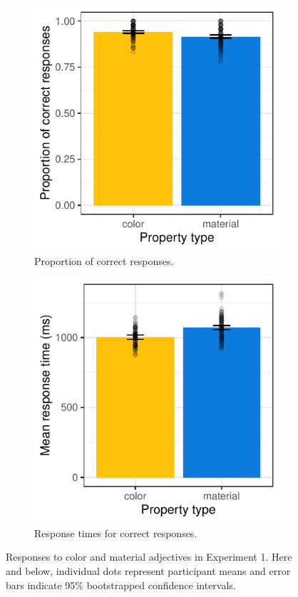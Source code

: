 \documentclass[12pt,letterpaper]{article}
\begin{document}
\begin{figure}[ht]
\centering
\begin{subfigure}{.4\textwidth}
\centering
\includegraphics[width=\textwidth]{plots/exp1_proportion.pdf}
\caption{Proportion of correct responses.}
\label{fig:exp1_a}
\end{subfigure} \hspace{9mm}
\begin{subfigure}{.4 \textwidth}
\centering
\includegraphics[width=\textwidth]{plots/exp1_rt.pdf}
\caption{Response times for correct responses.}
\label{fig:exp1_b}
\end{subfigure}
\caption{Responses to color and material adjectives in Experiment 1. Here and below, individual dots represent participant means and error bars indicate 95\% bootstrapped confidence intervals.}
\label{fig:exp1}
\end{figure}  
\end{document}
